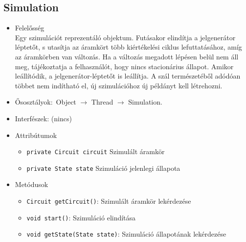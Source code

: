\subsection{Simulation}
\begin{itemize}
\item Felelősség\\
Egy szimulációt reprezentáló objektum.  Futásakor elindítja a jelgenerátor léptetőt, s utasítja az áramkört több kiértékelési  ciklus lefuttatásához, amíg az áramkörben van változás. Ha a változás megadott lépésen belül  nem áll meg, tájékoztatja a felhasználót, hogy nincs stacionárius állapot.  Amikor leállítódik, a jelgenerátor-léptetőt is leállítja.  A szál természetéből adódóan többet nem indítható el, új szimulációhoz új példányt kell létrehozni.
\item Ősosztályok:\ Object $\rightarrow{}$ Thread $\rightarrow{}$ Simulation.
\item Interfészek: (nincs)
\item Attribútumok $\ $
\begin{itemize}
	\item \texttt{private Circuit circuit} Szimulált áramkör
	\item \texttt{private State state} Szimuláció jelenlegi állapota
\end{itemize}
\item Metódusok$\ $
\begin{itemize}
	\item \texttt{Circuit getCircuit()}: Szimulált áramkör lekérdezése
	\item \texttt{void start()}: Szimuláció elindítása
	\item \texttt{void getState(State state)}: Szimuláció állapotának lekérdezése
\end{itemize}
\end{itemize}

